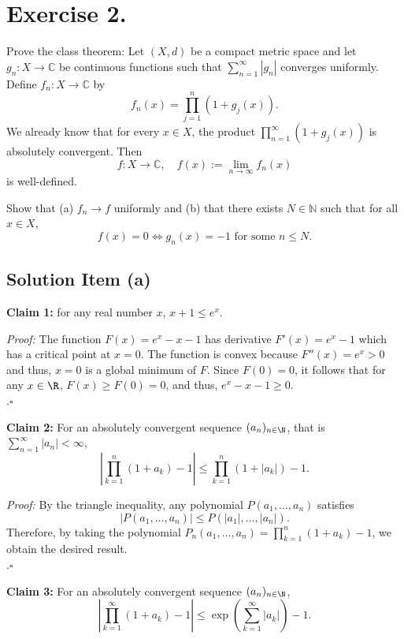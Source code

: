 
\section{Exercise 2.}

Prove the class theorem:  
Let \((X, d)\) be a compact metric space and let \(g_n : X \to \mathbb{C}\) be continuous functions such that \(\sum_{n=1}^{\infty} |g_n|\) converges uniformly. Define \(f_n : X \to \mathbb{C}\) by
\[
f_n(x) = \prod_{j=1}^{n} (1 + g_j(x)).
\]
We already know that for every \(x \in X\), the product \(\prod_{n=1}^{\infty} (1 + g_j(x))\) is absolutely convergent. Then
\[
f : X \to \mathbb{C}, \quad f(x) := \lim_{n \to \infty} f_n(x)
\]
is well-defined.

Show that (a) \(f_n \to f\) uniformly and (b) that there exists \(N \in \mathbb{N}\) such that for all \(x \in X\),
\[
f(x) = 0 \iff g_n(x) = -1 \text{ for some } n \leq N.
\]

\subsection*{Solution Item (a)}

\textbf{Claim 1:} for any real number $x$, $x+1\leq e^x$.

\textit{Proof:} The function $F(x) = e^x - x - 1$ has derivative $F'(x) = e^x - 1$ which has a critical point at $x = 0$. The function is convex because $F''(x) = e^x > 0$ and thus, $x= 0$ is a global minimum of $F$. Since $F(0) = 0$, it follows that for any $x \in \R$, $F(x) \geq F(0) = 0$, and thus, $e^x - x - 1 \geq 0$.\\.\hfill $\square$

\textbf{Claim 2:} For an absolutely convergent sequence $(a_n)_{n\in \N}$, that is $\sum_{n = 1}^{\infty} |a_n| < \infty$,
\[ \left| \prod_{k = 1}^{n} (1+a_k) - 1\right| \leq \prod_{k = 1}^n (1+ |a_k|) - 1. \]

\textit{Proof:} By the triangle inequality, any polynomial $P(a_1,\ldots, a_n)$ satisfies
\[ |P(a_1,\ldots, a_n)| \leq P(|a_1|,\ldots, |a_n|). \]
Therefore, by taking the polynomial $P_n(a_1,\ldots, a_n) = \prod_{k = 1}^{n} (1+a_k) - 1$, we obtain the desired result.\\.\hfill $\square$

\textbf{Claim 3:} For an absolutely convergent sequence $(a_n)_{n\in \N}$,
\[ \left| \prod_{k = 1}^{\infty} (1+a_k) - 1 \right| \leq \exp\left( \sum_{k = 1}^{\infty} |a_k| \right) - 1. \]

